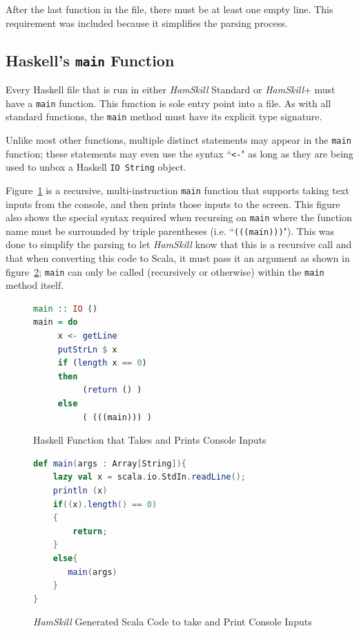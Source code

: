 \documentclass{report}
\begin{document}
After the last function in the file, there must be at least one empty line.  This requirement was included because it simplifies the parsing process.

\subsection{Haskell's \texttt{main} Function}\label{sec:mainFunction}

Every Haskell file that is run in either \textit{HamSkill} Standard or \textit{HamSkill}+ must have a \texttt{main} function.  This function is sole entry point into a file.  As with all standard functions, the \texttt{main} method must have its explicit type signature.

Unlike most other functions, multiple distinct statements may appear in the \texttt{main} function; these statements may even use the syntax ``\texttt{<-}" as long as they are being used to unbox a Haskell \texttt{IO String} object.

Figure~\ref{fig:functionHaskellMainConsoleInput} is a recursive, multi-instruction \texttt{main} function that supports taking text inputs from the console, and then prints those inputs to the screen.  This figure also shows the special syntax required when recursing on \texttt{main} where the function name must be surrounded by triple parentheses (i.e. ``\texttt{(((main)))}").  This was done to simplify the parsing to let \textit{HamSkill} know that this is a recursive call and that when converting this code to Scala, it must pass it an argument as shown in figure~\ref{fig:functionScalaMainConsoleInput}; \texttt{main} can only be called (recursively or otherwise) within the \texttt{main} method itself.

\begin{figure}[H]
\begin{mdframed}
\begin{lstlisting}[language=Haskell]
main :: IO ()
main = do 
     x <- getLine 
     putStrLn $ x
     if (length x == 0) 
     then 
          (return () )
     else
          ( (((main))) )
\end{lstlisting}
\end{mdframed}
\caption{Haskell Function that Takes and Prints Console Inputs}\label{fig:functionHaskellMainConsoleInput}
\end{figure}

\begin{figure}[H]
\begin{mdframed}
\begin{lstlisting}[language=scala]
def main(args : Array[String]){
    lazy val x = scala.io.StdIn.readLine();
    println (x)
    if((x).length() == 0)
    {
        return;
    }
    else{
       main(args)
    }
}
\end{lstlisting}
\end{mdframed}
\caption{\textit{HamSkill} Generated Scala Code to take and Print Console Inputs}\label{fig:functionScalaMainConsoleInput}
\end{figure}
\end{document}
